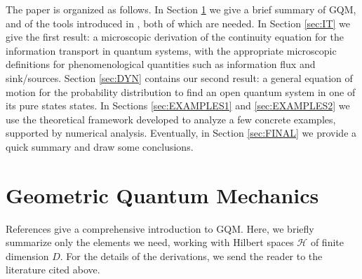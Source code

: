 \documentclass[draft,nofootinbib,pre,twocolumn,showpacs,showkeys,preprintnumbers,floatfix]{revtex4-1}
\newcommand{\1}{\mathbbm{1}}
\begin{document}
The paper is organized as follows. In Section \ref{sec:GQM} we give a brief summary of 
GQM, and of the tools introduced in \cite{Anza20a,Anza20b}, both of which are needed.
In Section \ref{sec:IT} we give the first result: a microscopic derivation of the continuity equation 
for the information transport in quantum systems, with the appropriate microscopic definitions for 
phenomenological quantities such as information flux and sink/sources. Section \ref{sec:DYN}
contains our second result: a general equation of motion for the probability distribution to 
find an open quantum system in one of its pure states states. In Sections \ref{sec:EXAMPLES1} 
and \ref{sec:EXAMPLES2} we use the theoretical framework developed to analyze a few concrete 
examples, supported by numerical analysis. Eventually, in Section \ref{sec:FINAL} we provide 
a quick summary and draw some conclusions. 








\section{Geometric Quantum Mechanics}
\label{sec:GQM}

References
\cite{STROCCHI1966,Miel68,Kibble1979,Heslot1985,Page87,And90,Gibbons1992,Ashtekar1995,Ashtekar1999,Brody2001,Bengtsson2017,Carinena2007,Chruscinski2006,Marmo2010,Avron2020,Pastorello2015,Pastorello2015a,Pastorello2016,Clemente-Gallardo2013}
give a comprehensive introduction to GQM. Here, we briefly summarize only the
elements we need, working with Hilbert spaces $\mathcal{H}$ of finite dimension $D$.
For the details of the derivations, we send the reader to the literature cited above.
\end{document}
